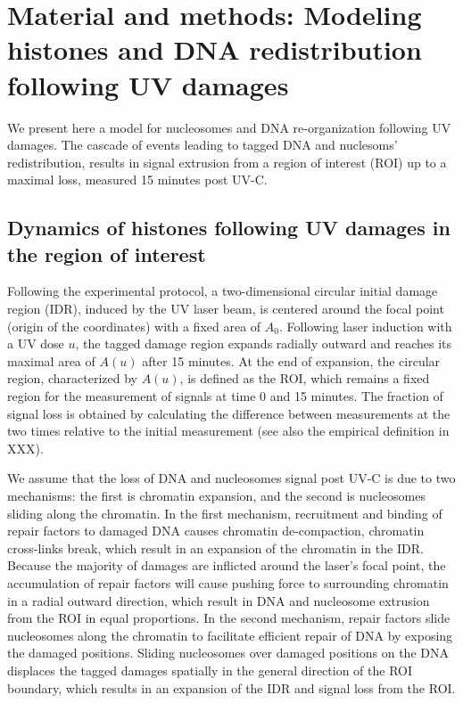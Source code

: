\documentclass[12pt]{article}
\begin{document}
\section{Material and methods: Modeling  histones and DNA redistribution following UV damages}
We present here a model for nucleosomes and DNA re-organization following UV damages. The cascade of events leading to tagged DNA and nuclesoms'  redistribution, results in signal extrusion from a region of interest (ROI) up to a maximal loss, measured 15 minutes post UV-C. 

\subsection{Dynamics of histones following UV damages in the region of interest}

Following the experimental protocol, a two-dimensional circular initial damage region (IDR), induced by the UV laser beam, is centered around the focal point (origin of the coordinates) with a fixed area of $A_0$. Following laser induction with a UV dose $u$, the tagged damage region expands radially outward and reaches its maximal area of $A(u)$ after 15 minutes. At the end of expansion, the circular region, characterized by $A(u)$, is defined as the ROI, which remains a fixed region for the measurement of signals at time 0 and 15 minutes. The fraction of signal loss is obtained by calculating the difference between measurements at the two times relative to the initial measurement (see also the empirical definition in XXX). 

We assume that the loss of DNA and nucleosomes signal post UV-C is due to two mechanisms: the first is chromatin expansion, and the second is nucleosomes sliding along the chromatin. In the first mechanism, recruitment and binding of repair factors to damaged DNA causes chromatin de-compaction, chromatin cross-links break, which result in an expansion of the chromatin in the IDR. Because the majority of damages are inflicted around the laser’s focal point, the accumulation of repair factors will cause pushing force to surrounding chromatin in a radial outward direction, which result in DNA and nucleosome extrusion from the ROI in equal proportions. In the second mechanism, repair factors slide nucleosomes along the chromatin to facilitate efficient repair of DNA by exposing the damaged positions. Sliding nucleosomes over damaged positions on the DNA displaces the tagged damages spatially in the general direction of the ROI boundary, which results in an expansion of the IDR and signal loss from the ROI.
\end{document}
